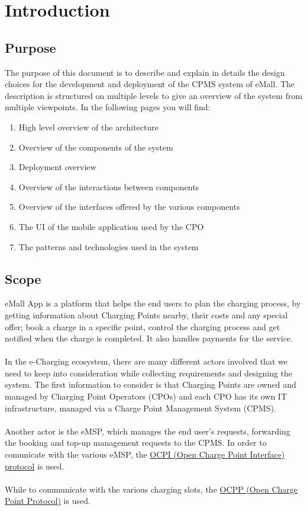 \chapter{Introduction}
\section{Purpose}
The purpose of this document is to describe and explain in details the design choices for the development and deployment of the CPMS system of eMall. The description is structured on multiple levels to give an overview of the system from multiple viewpoints. In the following pages you will find:

\begin{enumerate}
	\item High level overview of the architecture
	\item Overview of the components of the system
	\item Deployment overview
	\item Overview of the interactions between components
	\item Overview of the interfaces offered by the various components
	\item The UI of the mobile application used by the CPO
	\item The patterns and technologies used in the system
\end{enumerate}

\section{Scope}
eMall App is a platform that helps the end users to plan the charging process, by getting information about Charging Points nearby, their costs and any special offer; book a charge in a specific point, control the charging process and get notified when the charge is completed. It also handles payments for the service.\\\\
In the e-Charging ecosystem, there are many different actors involved that we need to keep into consideration while collecting requirements and designing the system. The first information to consider is that Charging Points are owned and managed by Charging Point Operators (CPOs) and each CPO has its own IT infrastructure, managed via a Charge Point Management System (CPMS). \\\\
Another actor is the eMSP, which manages the end user's requests, forwarding the booking and top-up management requests to the CPMS. 
In order to comunicate with the various eMSP, the 
\href{../Specs/OCPI-2.2.1.pdf}{OCPI (Open Charge Point Interface) protocol} is used.\\\\
While to communicate with the various charging slots, the 
\href{../Specs/ocpp-1.6.pdf}{OCPP (Open Charge Point Protocol)} is used.\\\\

